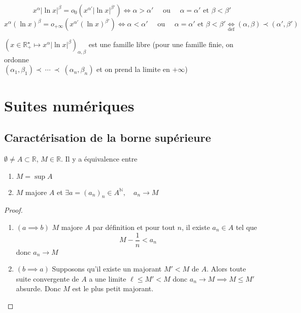\begin{ex}
    \[ x^\alpha|\ln x|^\beta=o_0(x^{\alpha'}|\ln x|^{\beta'})\iff \alpha>\alpha'\quad \text{ ou }\quad \alpha=\alpha'\text{ et }\beta<\beta'\]
    \[x^\alpha (\ln x)^\beta=o_{+\infty}(x^{\alpha'}(\ln x)^{\beta'})\iff \alpha<\alpha'\quad\text{ ou }\quad \alpha=\alpha'\text{ et }\beta<\beta'\underset{\text{def}}\iff (\alpha, \beta)\prec (\alpha', \beta')\]
\end{ex}

\begin{csq}
    $(x\in\mathbb R_+^\star\longmapsto x^\alpha |\ln x|^\beta)_{\alpha,\beta}$ est une famille libre (pour une famille finie, on ordonne \\$(\alpha_1, \beta_1)\prec~\cdots~\prec~(\alpha_n,\beta_n)$ et on prend la limite en $+\infty$)
\end{csq}

\section{Suites numériques}

\subsection{Caractérisation de la borne supérieure}

\begin{thm}
    \Hyp $\emptyset\neq A\subset\mathbb R$, $M\in\mathbb R$.
    \Conc Il y a équivalence entre \begin{enumerate}[label=(\alph{enumi}),left=1.2cm]
        \item $M=\sup A$
        \item $M$ majore $A$ et $\exists a=(a_n)_n\in A^{\mathbb N}, \quad a_n \longrightarrow M$
    \end{enumerate}
\end{thm}

\begin{proof}
    ~ \begin{enumerate}
        \item $(a\implies b)$ $M$ majore $A$ par définition et pour tout $n$, il existe $a_n\in A$ tel que \[
                M-\frac1n<a_n
            \]
            donc $a_n\longrightarrow M$
        \item $(b\implies a)$ Supposons qu'il existe un majorant $M'<M$ de $A$. Alors toute suite convergente de $A$ a une limite $\ell\leq M'<M$ donc $a_n\longrightarrow M\implies M\leq M'$ absurde. Donc $M$ est le plus petit majorant.
    \end{enumerate}
\end{proof}

